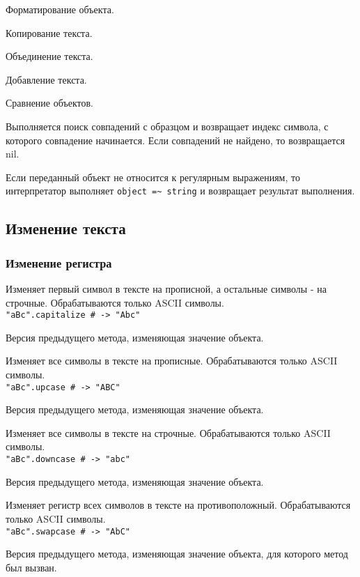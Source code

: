 \begin{methodlist}
  Форматирование объекта.

  Копирование текста.

  Объединение текста.

  Добавление текста.

  Сравнение объектов.

  Выполняется поиск совпадений с образцом и возвращает индекс символа, с которого совпадение начинается. Если совпадений не найдено, то возвращается nil.

  Если переданный объект не относится к регулярным выражениям, то интерпретатор выполняет \verb!object =~ string! и возвращает результат выполнения.
\end{methodlist}

\subsection*{Изменение текста}

\subsubsection*{Изменение регистра}

\begin{methodlist}
  Изменяет первый символ в тексте на прописной, а остальные символы - на строчные. Обрабатываются только ASCII символы.
  \\\verb!"aBc".capitalize # -> "Abc"!

  Версия предыдущего метода, изменяющая значение объекта.

  Изменяет все символы в тексте на прописные. Обрабатываются только ASCII символы.
  \\\verb!"aBc".upcase # -> "ABC"!

  Версия предыдущего метода, изменяющая значение объекта.

  Изменяет все символы в тексте на строчные. Обрабатываются только ASCII символы.
  \\\verb!"aBc".downcase # -> "abc"!

  Версия предыдущего метода, изменяющая значение объекта.

  Изменяет регистр всех символов в тексте на противоположный. Обрабатываются только ASCII символы.
  \\\verb!"aBc".swapcase # -> "AbC"!

  Версия предыдущего метода, изменяющая значение объекта, для которого метод был вызван.
\end{methodlist}

